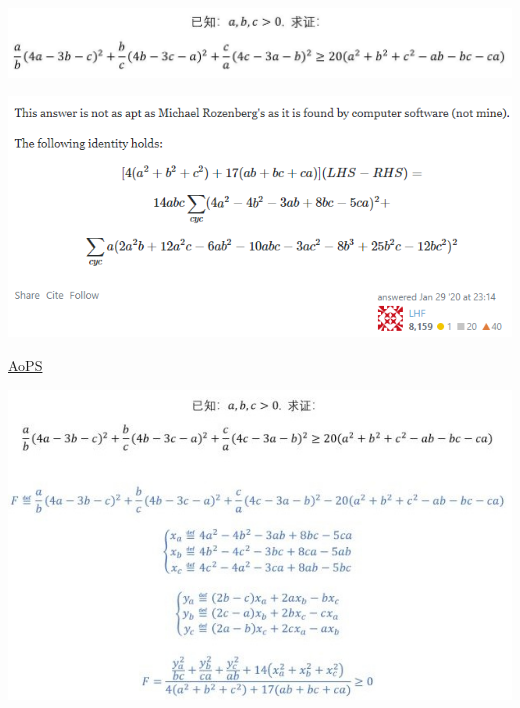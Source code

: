 \documentclass[UTF8]{ctexart}
\begin{document}
\subsection{}
\begin{center}
	\includegraphics[width=0.8\linewidth]{a36}
\end{center}
\begin{center}
	\includegraphics[width=0.8\linewidth]{a37}
\end{center}
\href{https://math.stackexchange.com/questions/3527494/}{AoPS}
\begin{center}
	\includegraphics[width=0.7\linewidth]{a38}
\end{center}
\end{document}
